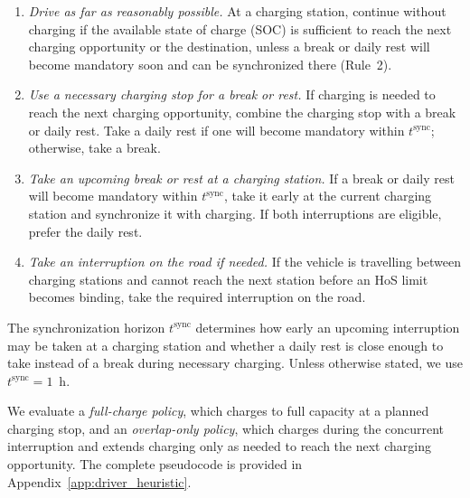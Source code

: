 \documentclass[3p,11pt,authoryear]{elsarticle}  %
\begin{document}
\begin{enumerate}
    \item \textit{Drive as far as reasonably possible.}
    At a charging station, continue without charging if the available state
    of charge (SOC) is sufficient to reach the next charging opportunity or
    the destination, unless a break or daily rest will become mandatory soon
    and can be synchronized there (Rule~2).

    \item \textit{Use a necessary charging stop for a break or rest.}
    If charging is needed to reach the next charging opportunity, combine
    the charging stop with a break or daily rest. Take a daily rest if one     will become mandatory within \(t^{\mathrm{sync}}\); otherwise, take a     break.
    
    \item \textit{Take an upcoming break or rest at a charging station.}
    If a break or daily rest will become mandatory within
    \(t^{\mathrm{sync}}\), take it early at the current charging station and     synchronize it with charging. If both interruptions are eligible, prefer     the daily rest.

    

    \item \textit{Take an interruption on the road if needed.}
    If the vehicle is travelling between charging stations and cannot reach
    the next station before an HoS limit becomes binding, take the required
    interruption on the road.
\end{enumerate}

The synchronization horizon \(t^{\mathrm{sync}}\) determines how early an
upcoming interruption may be taken at a charging station and whether a daily
rest is close enough to take instead of a break during necessary charging.
Unless otherwise stated, we use \(t^{\mathrm{sync}}=1\)~h.

We evaluate a \emph{full-charge policy}, which charges to full capacity at a planned charging stop, and an \emph{overlap-only policy}, which charges during the concurrent interruption and extends charging only as needed to reach the next charging opportunity. The complete pseudocode is provided in Appendix~\ref{app:driver_heuristic}.
\end{document}

